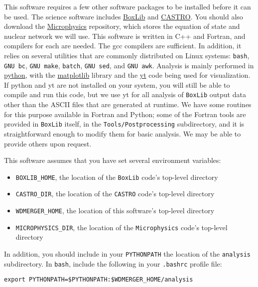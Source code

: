 \documentclass[12pt]{book}
\begin{document}
This software requires a few other software packages to be installed before it can be used.
The science software includes \href{http://boxlib-codes.github.io/}{BoxLib} and 
\href{http://boxlib-codes.github.io/Castro/}{CASTRO}. You should also 
download the \href{https://github.com/BoxLib-Codes/Microphysics}{Microphysics} repository, 
which stores the equation of state and nuclear network we will use. This software is written 
in C++ and Fortran, and compilers for each are needed. The gcc compilers are sufficient.
In addition, it relies on several utilities that are 
commonly distributed on Linux systems: \texttt{bash}, \texttt{GNU bc}, \texttt{GNU make}, 
\texttt{batch}, \texttt{GNU sed}, and \texttt{GNU awk}. Analysis is mainly performed in 
\href{https://www.python.org/}{python}, with the \href{http://matplotlib.org/}{matplotlib} 
library and the \href{http://yt-project.org/}{yt} code being used for visualization. 
If python and yt are not installed on your system, you will still be able to compile and 
run this code, but we use yt for all analysis of \texttt{BoxLib} output data other than 
the ASCII files that are generated at runtime. We have some routines for this purpose 
available in Fortran and Python; some of the Fortran tools are provided in \texttt{BoxLib} 
itself, in the \texttt{Tools/Postprocessing} subdirectory, and it is straightforward enough 
to modify them for basic analysis. We may be able to provide others upon request.

This software assumes that you have set several environment variables:
\begin{itemize}
  \item \texttt{BOXLIB\_HOME}, the location of the \texttt{BoxLib} code's top-level directory
  \item \texttt{CASTRO\_DIR}, the location of the \texttt{CASTRO} code's top-level directory
  \item \texttt{WDMERGER\_HOME}, the location of this software's top-level directory
  \item \texttt{MICROPHYSICS\_DIR}, the location of the \texttt{Microphysics} code's top-level directory
\end{itemize}

In addition, you should include in your \texttt{PYTHONPATH} the location of the 
\texttt{analysis} subdirectory. In \texttt{bash}, include the following in your 
\texttt{.bashrc} profile file:

\texttt{export PYTHONPATH=\$PYTHONPATH:\$WDMERGER\_HOME/analysis}
\end{document}
